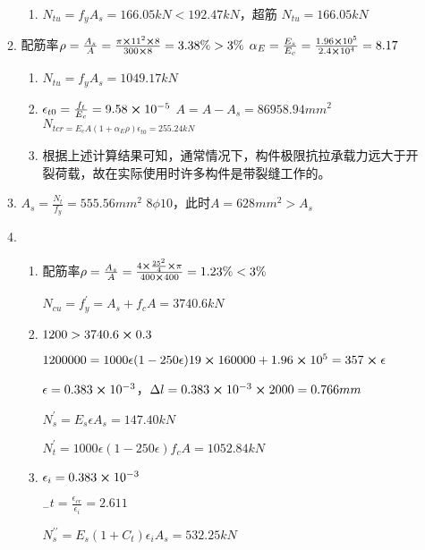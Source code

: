 \documentclass{article}
\begin{document}
\begin{enumerate}
\begin{enumerate}[1.]
\begin{enumerate}
                        \item $N_{tu}=f_yA_s=166.05kN<192.47kN$，超筋
                              $N_{tu}=166.05kN$
                    \end{enumerate}
              \item 配筋率$\rho=\frac{A_s}{A}=\frac{\pi\cross 11^2\cross 8}{300\cross 8}=3.38\%>3\%$
                    $\alpha_E=\frac{E_s}{E_c}=\frac{1.96\cross10^5}{2.4\cross 10^4}=8.17$
                    \begin{enumerate}
                        \item $N_{tu}=f_yA_s=1049.17kN$
                        \item $\epsilon_{t0}=\frac{f_t}{E_c}=9.58\cross10^{-5}$
                              $A=A-A_s=86958.94mm^2$
                              $N_{tcr=E_cA(1+\alpha_E\rho)\epsilon_{t0}=255.24kN}$
                        \item 根据上述计算结果可知，通常情况下，构件极限抗拉承载力远大于开裂荷载，故在实际使用时许多构件是带裂缝工作的。
                    \end{enumerate}
              \item $A_s=\frac{N_t}{f_y}=555.56mm^2$
                    $8\phi10$，此时$A=628mm^2>A_s$
              \item \begin{enumerate}
                        \item 配筋率$\rho=\frac{A_s}{A}=\frac{4\cross\frac{25^2}{4}\cross\pi}{400\cross400}=1.23\%<3\%$
                              \par$N_{cu}=f_y^{\prime}=A_s+f_cA=3740.6kN$
                        \item $1200>3740.6\cross0.3$
                              \par$1200000=1000\epsilon(1-250\epsilon)19\cross160000+1.96\cross10^5=357\cross\epsilon$
                              \par$\epsilon=0.383\cross10^{-3}$，$\Delta l=0.383\cross10^{-3}\cross2000=0.766mm$
                              \par$N_s^{\prime}=E_s\epsilon A_s=147.40kN$
                              \par$N_t^{\prime}=1000\epsilon(1-250\epsilon)f_cA=1052.84kN$
                        \item $\epsilon_i=0.383\cross10^{-3}$
                              \par$_-t=\frac{\epsilon_{cr}}{\epsilon_i}=2.611$
                              \par$N_s^{\prime\prime}=E_s(1+C_t)\epsilon_iA_s=532.25kN$

\end{enumerate}
\end{enumerate}
\end{enumerate}
\end{document}
